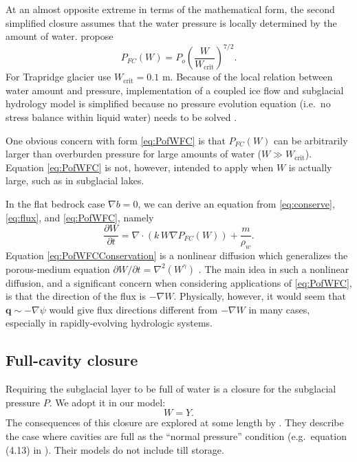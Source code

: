 \documentclass[gmd]{copernicus}   %
\newcommand{\text}{\textrm}
\newcommand\bq{\mathbf{q}}
\newcommand{\Div}{\nabla\cdot}
\newcommand{\grad}{\nabla}
\begin{document}
At an almost opposite extreme in terms of the mathematical form, the second simplified closure assumes that the water pressure is locally determined by the amount of water.  \cite{FlowersClarke2002_theory} propose
\begin{equation}
P_{FC}(W) = P_o \left(\frac{W}{W_{\text{crit}}}\right)^{7/2}. \label{eq:PofWFC}
\end{equation}
For Trapridge glacier \cite{FlowersClarke2002_trapridge} use $W_{\text{crit}}=0.1$ m.  Because of the local relation between water amount and pressure, implementation of a coupled ice flow and subglacial hydrology model is simplified because no pressure evolution equation (i.e.~no stress balance within liquid water) needs to be solved \citep{PimentelFlowersSchoof2010,PimentelFlowers2011}.

One obvious concern with form \eqref{eq:PofWFC} is that $P_{FC}(W)$ can be arbitrarily larger than overburden pressure for large amounts of water ($W \gg W_{\text{crit}}$).  Equation \eqref{eq:PofWFC} is not, however, intended to apply when $W$ is actually large, such as in subglacial lakes.

In the flat bedrock case $\grad b = 0$, we can derive an equation from \eqref{eq:conserve}, \eqref{eq:flux}, and \eqref{eq:PofWFC}, namely
\begin{equation}
\frac{\partial W}{\partial t} =  \Div \left(k\,W \grad P_{FC}(W)\right) + \frac{m}{\rho_w}. \label{eq:PofWFCConservation}
\end{equation}
Equation \eqref{eq:PofWFCConservation} is a nonlinear diffusion \citep{Schoofetal2012} which generalizes the porous-medium equation $\partial W/\partial t = \grad^2 (W^\gamma)$ \citep{VazquezPME}.  The main idea in such a nonlinear diffusion, and a significant concern when considering applications of \eqref{eq:PofWFC}, is that the direction of the flux is $-\grad W$.  Physically, however, it would seem that $\bq \sim -\grad \psi$ would give flux directions different from $-\grad W$ in many cases, especially in rapidly-evolving hydrologic systems.

\subsection{Full-cavity closure}  Requiring the subglacial layer to be full of water is a closure for the subglacial pressure $P$.  We adopt it in our model:
\begin{equation}
W = Y.\label{eq:strongclosure}
\end{equation}
The consequences of this closure are explored at some length by \cite{Schoofetal2012,Hewittetal2012,Werderetal2013}.  They describe the case where cavities are full as the ``normal pressure'' condition (e.g.~equation (4.13) in \cite{Schoofetal2012}).  Their models do not include till storage.
\end{document}
